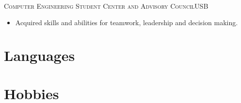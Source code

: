 \documentclass[10pt]{moderncv}
\begin{document}
{\textsc{Computer Engineering Student Center and Advisory Council}}{USB}{}{%
\begin{itemize}
    \item Acquired skills and abilities for teamwork, leadership and decision making.
\end{itemize}
}

\section{Languages}


\section{Hobbies}
\end{document}
